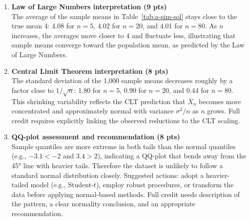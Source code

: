 \documentclass[11pt]{article}
\begin{document}
\begin{enumerate}
  \item \textbf{Law of Large Numbers interpretation (9 pts)}\\
  The average of the sample means in Table~\ref{tab:a-sim-sol} stays close to the true mean 4: 4.08 for $n=5$, 4.02 for $n=20$, and 4.01 for $n=80$. As $n$ increases, the averages move closer to 4 and fluctuate less, illustrating that sample means converge toward the population mean, as predicted by the Law of Large Numbers.

  \item \textbf{Central Limit Theorem interpretation (8 pts)}\\
  The standard deviation of the 1{,}000 sample means decreases roughly by a factor close to $1/\sqrt{n}$: 1.80 for $n=5$, 0.90 for $n=20$, and 0.44 for $n=80$. This shrinking variability reflects the CLT prediction that $\bar X_n$ becomes more concentrated and approximately normal with variance $\sigma^2/n$ as $n$ grows. Full credit requires explicitly linking the observed reductions to the CLT scaling.

  \item \textbf{QQ-plot assessment and recommendation (8 pts)}\\
  Sample quantiles are more extreme in both tails than the normal quantiles (e.g., $-3.1<-2$ and $3.4>2$), indicating a QQ-plot that bends away from the 45° line with heavier tails. Therefore the dataset is unlikely to follow a standard normal distribution closely. Suggested actions: adopt a heavier-tailed model (e.g., Student-$t$), employ robust procedures, or transform the data before applying normal-based methods. Full credit needs description of the pattern, a clear normality conclusion, and an appropriate recommendation.
\end{enumerate}
\end{document}
